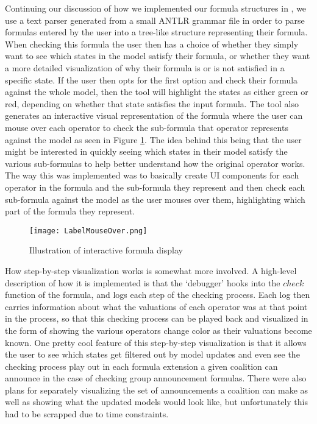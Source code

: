 Continuing our discussion of how we implemented our formula structures in \cname, we use a text parser generated from a small ANTLR grammar file in order to parse formulas entered by the user into a tree-like structure representing their formula. When checking this formula the user then has a choice of whether they simply want to see which states in the model satisfy their formula, or whether they want a more detailed visualization of why their formula is or is not satisfied in a specific state. If the user then opts for the first option and check their formula against the whole model, then the tool will highlight the states as either green or red, depending on whether that state satisfies the input formula. The tool also generates an interactive visual representation of the formula where the user can mouse over each operator to check the sub-formula that operator represents against the model as seen in Figure \ref{fig:labelHover}. The idea behind this being that the user might be interested in quickly seeing which states in their model satisfy the various sub-formulas to help better understand how the original operator works. The way this was implemented was to basically create UI components for each operator in the formula and the sub-formula they represent and then check each sub-formula against the model as the user mouses over them, highlighting which part of the formula they represent.

\begin{figure}[H]
	\label{fig:labelHover}
	\caption{Illustration of interactive formula display}
	\texttt{[image: LabelMouseOver.png]}
\end{figure}

How step-by-step visualization works is somewhat more involved. A high-level description of how it is implemented is that the `debugger' hooks into the $check$ function of the formula, and logs each step of the checking process. Each log then carries information about what the valuations of each operator was at that point in the process, so that this checking process can be played back and visualized in the form of showing the various operators change color as their valuations become known. One pretty cool feature of this step-by-step visualization is that it allows the user to see which states get filtered out by model updates and even see the checking process play out in each formula extension a given coalition can announce in the case of checking group announcement formulas. There were also plans for separately visualizing the set of announcements a coalition can make as well as showing what the updated models would look like, but unfortunately this had to be scrapped due to time constraints.

